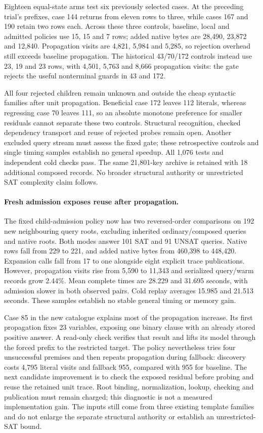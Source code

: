 \documentclass[11pt,a4paper]{article}
\numberwithin{equation}{section}
\theoremstyle{plain}
\theoremstyle{definition}
\theoremstyle{remark}
\begin{document}
Eighteen equal-state arms test six previously selected cases. At the preceding
trial's prefixes, case 144 returns from eleven rows to three, while cases 167
and 190 retain two rows each. Across these three controls, baseline, local and
admitted policies use 15, 15 and 7 rows; added native bytes are 28,490, 23,872
and 12,840. Propagation visits are 4,821, 5,984 and 5,285, so rejection overhead
still exceeds baseline propagation. The historical 43/70/172 controls instead
use 23, 19 and 23 rows, with 4,501, 5,763 and 8,666 propagation visits: the
gate rejects the useful nonterminal guards in 43 and 172.

All four rejected children remain unknown and outside the cheap syntactic
families after unit propagation. Beneficial case 172 leaves 112 literals,
whereas regressing case 70 leaves 111, so an absolute monotone preference for
smaller residuals cannot separate these two controls. Structural recognition,
checked dependency transport and reuse of rejected probes remain open. Another
excluded query stream must assess the fixed gate; these retrospective controls
and single timing samples establish no general speedup. All 1,076 tests and
independent cold checks pass. The same 21,801-key archive is retained with 18
additional composed records. No broader structural authority or unrestricted
SAT complexity claim follows.

\paragraph{Fresh admission exposes reuse after propagation.}
The fixed child-admission policy now has two reversed-order comparisons on
192 new neighbouring query roots, excluding inherited ordinary/composed queries
and native roots. Both modes answer 101 SAT and 91 UNSAT queries. Native rows
fall from 229 to 221, and added native bytes from 460,398 to 448,420. Expansion
calls fall from 17 to one alongside eight explicit trace publications. However,
propagation visits rise from 5,590 to 11,343 and serialized query/warm records
grow 2.44\%. Mean complete times are 28.229 and 31.695 seconds, with admission
slower in both observed pairs. Cold replay averages 15.985 and 21.513 seconds.
These samples establish no stable general timing or memory gain.

Case 85 in the new catalogue explains most of the propagation increase. Its
first propagation fixes 23 variables, exposing one binary clause with an
already stored positive answer. A read-only check verifies that result and
lifts its model through the forced prefix to the restricted target. The policy
nevertheless tries four unsuccessful premises and then repeats propagation
during fallback: discovery costs 4,795 literal visits and fallback 955, compared
with 955 for baseline. The next candidate improvement is to check the exposed
residual before probing and reuse the retained unit trace. Root binding,
normalization, lookup, checking and publication must remain charged; this
diagnostic is not a measured implementation gain. The inputs still come from
three existing template families and do not enlarge the separate structural
authority or establish an unrestricted-SAT bound.
\end{document}
